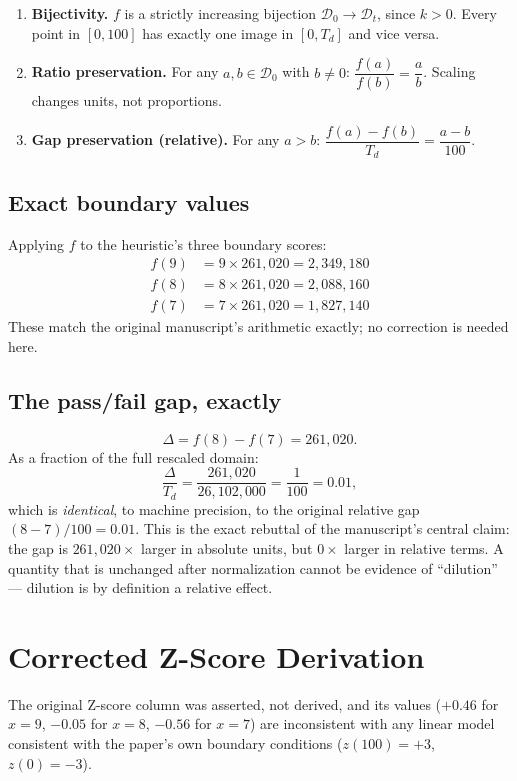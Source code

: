 \documentclass[10pt,journal,compsoc]{IEEEtran}
\begin{document}
\begin{enumerate}
    \item \textbf{Bijectivity.} $f$ is a strictly increasing bijection $\mathcal{D}_0 \to \mathcal{D}_t$, since $k>0$. Every point in $[0,100]$ has exactly one image in $[0,T_d]$ and vice versa.
    \item \textbf{Ratio preservation.} For any $a,b \in \mathcal{D}_0$ with $b \ne 0$: $\dfrac{f(a)}{f(b)} = \dfrac{a}{b}$. Scaling changes units, not proportions.
    \item \textbf{Gap preservation (relative).} For any $a>b$: $\dfrac{f(a)-f(b)}{T_d} = \dfrac{a-b}{100}$.
\end{enumerate}

\subsection{Exact boundary values}
Applying $f$ to the heuristic's three boundary scores:
\begin{align}
    f(9) &= 9 \times 261{,}020 = 2{,}349{,}180 \\
    f(8) &= 8 \times 261{,}020 = 2{,}088{,}160 \\
    f(7) &= 7 \times 261{,}020 = 1{,}827{,}140
\end{align}
These match the original manuscript's arithmetic exactly; no correction is needed here.

\subsection{The pass/fail gap, exactly}
\begin{equation}
    \Delta = f(8) - f(7) = 261{,}020.
\end{equation}
As a fraction of the full rescaled domain:
\begin{equation}
    \frac{\Delta}{T_d} = \frac{261{,}020}{26{,}102{,}000} = \frac{1}{100} = 0.01,
\end{equation}
which is \emph{identical}, to machine precision, to the original relative gap $(8-7)/100 = 0.01$. This is the exact rebuttal of the manuscript's central claim: the gap is $261{,}020\times$ larger in absolute units, but $0\times$ larger in relative terms. A quantity that is unchanged after normalization cannot be evidence of ``dilution'' — dilution is by definition a relative effect.

\section{Corrected Z-Score Derivation}
The original Z-score column was asserted, not derived, and its values ($+0.46$ for $x=9$, $-0.05$ for $x=8$, $-0.56$ for $x=7$) are inconsistent with any linear model consistent with the paper's own boundary conditions ($z(100)=+3$, $z(0)=-3$).
\end{document}
